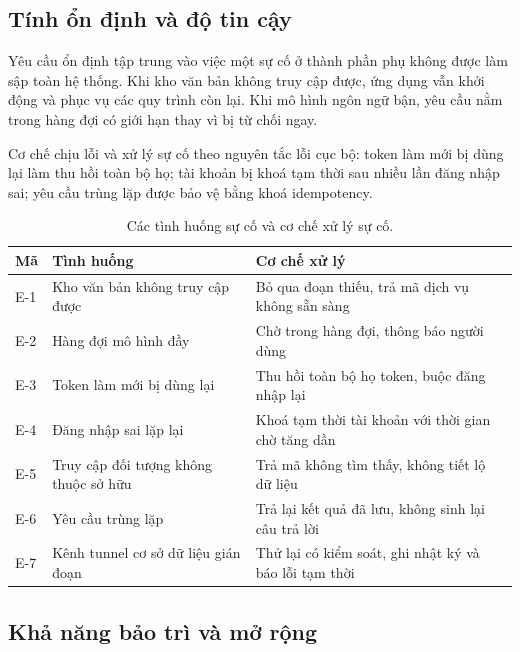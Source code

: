 \subsection{Tính ổn định và độ tin cậy}
\label{subsec:do-tin-cay}

Yêu cầu ổn định tập trung vào việc một sự cố ở thành phần phụ không được làm sập toàn hệ thống. Khi kho văn bản không truy cập được, ứng dụng vẫn khởi động và phục vụ các quy trình còn lại. Khi mô hình ngôn ngữ bận, yêu cầu nằm trong hàng đợi có giới hạn thay vì bị từ chối ngay.

Cơ chế chịu lỗi và xử lý sự cố theo nguyên tắc lỗi cục bộ: token làm mới bị dùng lại làm thu hồi toàn bộ họ; tài khoản bị khoá tạm thời sau nhiều lần đăng nhập sai; yêu cầu trùng lặp được bảo vệ bằng khoá idempotency.

\begin{table}[htbp]
    \centering
    \caption{Các tình huống sự cố và cơ chế xử lý sự cố.}
    \label{tab:co-che-bu-loi}
    \small
    \begin{tabularx}{\textwidth}{@{}l>{\raggedright\arraybackslash}p{4.6cm}>{\raggedright\arraybackslash}X@{}}
        \toprule
        \textbf{Mã} & \textbf{Tình huống} & \textbf{Cơ chế xử lý} \\
        \midrule
        E-1 & Kho văn bản không truy cập được & Bỏ qua đoạn thiếu, trả mã dịch vụ không sẵn sàng \\
        E-2 & Hàng đợi mô hình đầy & Chờ trong hàng đợi, thông báo người dùng \\
        E-3 & Token làm mới bị dùng lại & Thu hồi toàn bộ họ token, buộc đăng nhập lại \\
        E-4 & Đăng nhập sai lặp lại & Khoá tạm thời tài khoản với thời gian chờ tăng dần \\
        E-5 & Truy cập đối tượng không thuộc sở hữu & Trả mã không tìm thấy, không tiết lộ dữ liệu \\
        E-6 & Yêu cầu trùng lặp & Trả lại kết quả đã lưu, không sinh lại câu trả lời \\
        E-7 & Kênh tunnel cơ sở dữ liệu gián đoạn & Thử lại có kiểm soát, ghi nhật ký và báo lỗi tạm thời \\
        \bottomrule
    \end{tabularx}
\end{table}

\subsection{Khả năng bảo trì và mở rộng}
\label{subsec:kha-nang-bao-tri}

